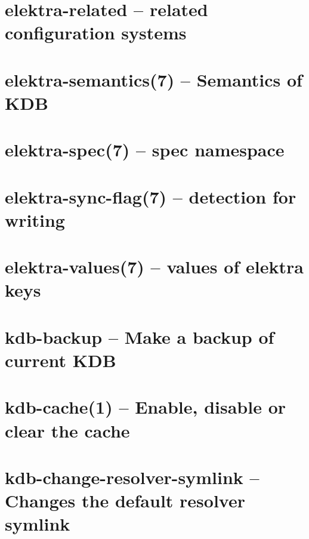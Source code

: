 \let\mypdfximage\pdfximage\def\pdfximage{\immediate\mypdfximage}\documentclass[twoside]{book}
\newcommand{\+}{\discretionary{\mbox{\scriptsize$\hookleftarrow$}}{}{}}
\begin{document}
\chapter{elektra-\/related -- related configuration systems}
\label{doc_help_elektra-related_md}

\chapter{elektra-\/semantics(7) -- Semantics of K\+DB}
\label{doc_help_elektra-semantics_md}

\chapter{elektra-\/spec(7) -- spec namespace}
\label{doc_help_elektra-spec_md}

\chapter{elektra-\/sync-\/flag(7) -- detection for writing}
\label{doc_help_elektra-sync-flag_md}

\chapter{elektra-\/values(7) -- values of elektra keys}
\label{doc_help_elektra-values_md}

\chapter{kdb-\/backup -- Make a backup of current K\+DB}
\label{doc_help_kdb-backup_md}

\chapter{kdb-\/cache(1) -- Enable, disable or clear the cache}
\label{doc_help_kdb-cache_md}

\chapter{kdb-\/change-\/resolver-\/symlink -- Changes the default resolver symlink}
\label{doc_help_kdb-change-resolver-symlink_md}

\end{document}
